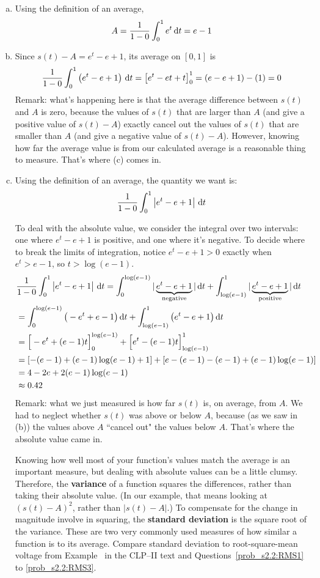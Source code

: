 \begin{solution}
\begin{enumerate}[(a)]
\item Using the definition of an average,
\[A=\frac{1}{1-0}\int_0^1 e^t\,\mathrm{d}t = e-1\]
\item Since $s(t)-A = e^t-e+1$, its average on $[0,1]$ is
\[\frac{1}{1-0}\int_0^1 \left(e^t-e+1\right)\,\mathrm{d}t = \left[e^t -et+t\right]_0^1 = (e-e+1)-(1)=0\]
Remark: what's happening here is that the average difference between $s(t)$ and $A$ is zero, because the values of $s(t)$ that are larger than $A$ (and give a positive value of $s(t)-A$) exactly cancel out the values of $s(t)$ that are smaller than $A$ (and give a negative value of $s(t)-A$). However, knowing how far the average value is from our calculated average is a reasonable thing to measure. That's where (c) comes in.
\item Using the definition of an average, the quantity we want is:
\[\frac{1}{1-0}\int_0^1\left| e^t-e+1\right|\,\mathrm{d}t\]

To deal with the absolute value, we consider the integral over two intervals: one where $e^t-e+1$ is positive, and one where it's negative. To decide where to break the limits of integration, notice $e^t-e+1>0$ exactly when $e^t>e-1$, so $t>\log(e-1)$.
\begin{align*}
&\frac{1}{1-0}\int_0^1\left| e^t-e+1\right|\,\mathrm{d}t=\int_0^{\log(e-1)}|\underbrace{e^t-e+1}_{\text{negative}}|\,\mathrm{d}t+\int_{\log(e-1)}^1|\underbrace{e^t-e+1}_{\text{positive}}|\,\mathrm{d}t\\
&=\int_0^{\log(e-1)}\big(-e^t+e-1\big)\,\mathrm{d}t+\int_{\log(e-1)}^1\big(e^t-e+1\big)\,\mathrm{d}t\\
&=\Big[-e^t+(e-1)t\Big]_0^{\log(e-1)}+
\Big[e^t-(e-1)t\Big]_{\log(e-1)}^1\\
&=\left[-(e-1)+(e-1)\log(e-1)+1\right]+
\left[e-(e-1)-(e-1)+(e-1)\log(e-1)\right]
\\&=4-2e+2(e-1)\log(e-1)\\
&\approx 0.42
\end{align*}
Remark: what we just measured is how far $s(t)$ is, on average, from $A$. We had to neglect whether $s(t)$ was above or below $A$, because (as we saw in (b)) the values above $A$ ``cancel out" the values below $A$. That's where the absolute value came in.

 Knowing how well most of your function's values match the average is an important measure, but dealing with absolute values can be a little clumsy. Therefore, the \textbf{variance} of a function squares the differences, rather than taking their absolute value. (In our example, that means looking at $(s(t)-A)^2$, rather than $|s(t)-A|$.) To compensate for the change in magnitude involve in squaring, the \textbf{standard deviation} is the square root of the variance. These are two very commonly used measures of how similar a function is to its average. Compare standard deviation to root-square-mean voltage from Example~ in the CLP--II text and Questions~\ref{prob_s2.2:RMS1} to \ref{prob_s2.2:RMS3}.
\end{enumerate}
\end{solution}

